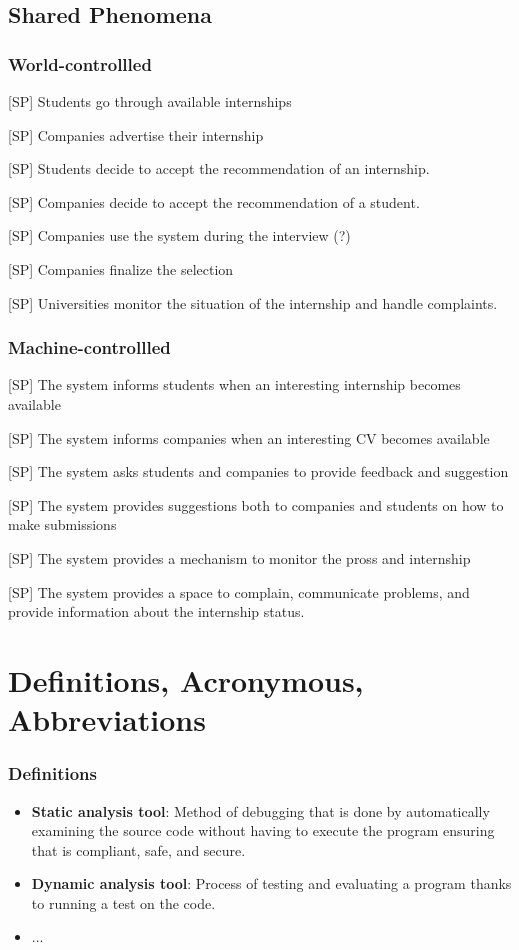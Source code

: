 \subsection{Shared Phenomena}

\subsubsection{World-controllled}
[SP] Students go through available internships

[SP] Companies advertise their internship

[SP] Students decide to accept the recommendation of an internship.

[SP] Companies decide to accept the recommendation of a student. 

[SP] Companies use the system during the interview (?)

[SP] Companies finalize the selection

[SP] Universities monitor the situation of the internship and handle complaints.


\subsubsection{Machine-controllled}
[SP] The system informs students when an interesting internship becomes available

[SP] The system informs companies when an interesting CV becomes available

[SP] The system asks students and companies to provide feedback and suggestion

[SP] The system provides suggestions both to companies and students on how to make submissions

[SP] The system provides a mechanism to monitor the pross and internship

[SP] The system provides a space to complain, communicate problems, and provide information about the internship status.

\section{Definitions, Acronymous, Abbreviations}
\subsubsection{Definitions}
\begin{itemize}
    \item \textbf{Static analysis tool}: Method of debugging that is done by automatically examining the source code without having to execute the program ensuring that is compliant, safe, and secure.
    \item \textbf{Dynamic analysis tool}: Process of testing and evaluating a program thanks to running a test on the code.

    \item ...
\end{itemize}

